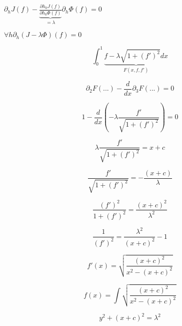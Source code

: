 \begin{example}
$\partial_h J(f) - \underbrace{\frac{\partial h_0 J(f)}{\partial h_0 \Phi(f)}}_{= \lambda} \partial_h \Phi(f) = 0$


$\forall h \partial_h (J - \lambda \Phi)(f) = 0$

\[
    \int_0^1 \underbrace{f - \lambda \sqrt{1 + (f') ^ 2} dx}_{F(x, f, f')}
\]

\[
    \partial_2 F (...) - \frac{d}{dx} \partial_3 F (...) = 0 
\]

\[
    1 - \frac{d}{dx} (-\lambda \frac{f'}{\sqrt{1 + (f')^2}}) = 0
\]

\[
    \lambda \frac{f'}{\sqrt{1 + (f') ^ 2}} = x + c
\]


\[
    \frac{f'}{\sqrt{1 + (f') ^ 2}} = -\frac{(x + c)}{\lambda}
\]


\[
    \frac{(f') ^ 2}{1 + (f') ^ 2} = \frac{(x + c) ^ 2}{\lambda ^ 2}
\]

\[
    \frac{1}{(f') ^ 2} = \frac{\lambda ^ 2}{(x + c) ^ 2} - 1
\]

\[
    f'(x) = \sqrt{\frac{(x + c) ^ 2}{x ^ 2 - (x + c) ^ 2}}
\]

\[
    f(x) = \int \sqrt{\frac{(x + c) ^ 2}{x ^ 2 - (x + c) ^ 2}}
\]

\[
    y ^ 2 + (x + c) ^ 2 = \lambda ^ 2 
\]
\end{example}